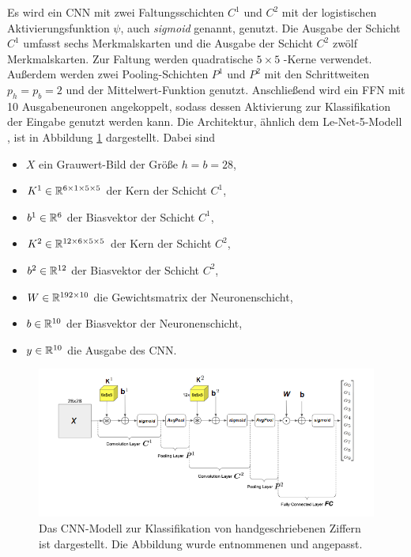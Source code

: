 Es wird ein CNN mit zwei Faltungsschichten $C^1$ und $C^2$ mit der logistischen Aktivierungsfunktion $\psi$, auch \textit{sigmoid} genannt, genutzt. Die Ausgabe der Schicht $C^1$ umfasst sechs Merkmalskarten und die Ausgabe der Schicht $C^2$ zwölf Merkmalskarten. Zur Faltung werden quadratische $5 \times 5$ -Kerne verwendet. Außerdem werden zwei Pooling-Schichten $P^1$ und $P^2$ mit den Schrittweiten $p_h=p_b=2$ und der Mittelwert-Funktion genutzt. Anschließend wird ein FFN mit 10 Ausgabeneuronen angekoppelt, sodass dessen Aktivierung zur Klassifikation der Eingabe genutzt werden kann. Die Architektur, ähnlich dem Le-Net-5-Modell \cite{DBLP:journals/pieee/LeCunBBH98}, ist in Abbildung \ref{modell} dargestellt. Dabei sind

\begin{itemize}
    \item $X$ ein Grauwert-Bild der Größe $h=b=28$,
    \item $K^1 \in \mathbb{R}^{6 \times 1 \times 5 \times 5}$ der Kern der Schicht $C^1$,
    \item $b^1 \in \mathbb{R}^6$ der Biasvektor der Schicht $C^1$,
    \item $K^2 \in \mathbb{R}^{12 \times 6 \times 5 \times 5}$ der Kern der Schicht $C^2$,
    \item $b^2 \in \mathbb{R}^{12}$ der Biasvektor der Schicht $C^2$,
    \item $W \in \mathbb{R}^{192 \times 10}$ die Gewichtsmatrix der Neuronenschicht,
    \item $b \in \mathbb{R}^{10}$ der Biasvektor der Neuronenschicht,
    \item $y \in \mathbb{R}^{10}$ die Ausgabe des CNN. 
\end{itemize}

\begin{figure}[h]
    \includegraphics[width=1.0\textwidth]{pics/chapters/CCN/modell_arch_anp.png}
    \centering
    \caption[Das in dieser Arbeit verwendete CNN-Modell]{Das CNN-Modell zur Klassifikation von handgeschriebenen Ziffern ist dargestellt. Die Abbildung wurde \cite{gentle} entnommenen und angepasst.}
    \label{modell}
\end{figure}

